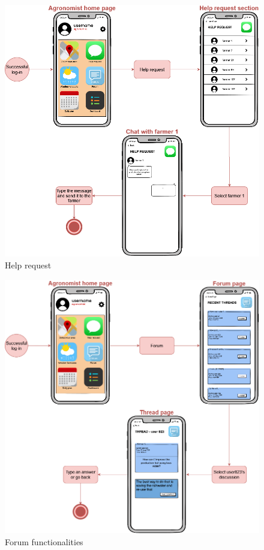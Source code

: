 \begin{center}
    \begin{figure}[H]
        \includegraphics[width=\textwidth]{Images/UserInterface/Diagram/appChart.drawio.png}
        \caption{Help request}
    \end{figure}
\end{center}
\newpage

\begin{center}
    \begin{figure}[H]
        \includegraphics[width=\textwidth]{Images/UserInterface/Diagram/agronomistForum.drawio.png}
        \caption{Forum functionalities}
    \end{figure}
\end{center}
\newpage

